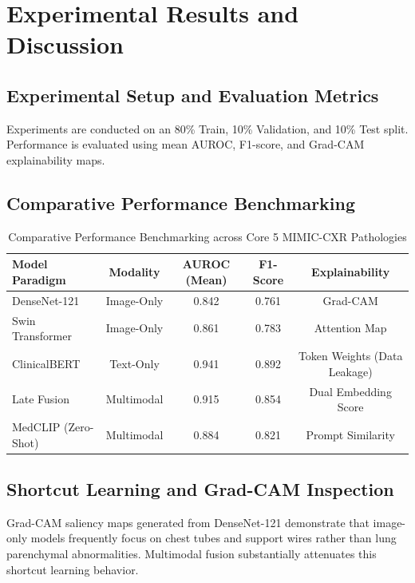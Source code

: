 \chapter{Experimental Results and Discussion}
\label{ch:experimental_results}

\section{Experimental Setup and Evaluation Metrics}
Experiments are conducted on an 80\% Train, 10\% Validation, and 10\% Test split. Performance is evaluated using mean AUROC, F1-score, and Grad-CAM explainability maps.

\section{Comparative Performance Benchmarking}

\begin{table}[H]
\centering
\caption{Comparative Performance Benchmarking across Core 5 MIMIC-CXR Pathologies}
\label{tab:results}
\begin{tabular}{lcccc}
\toprule
\textbf{Model Paradigm} & \textbf{Modality} & \textbf{AUROC (Mean)} & \textbf{F1-Score} & \textbf{Explainability} \\
\midrule
DenseNet-121 & Image-Only & 0.842 & 0.761 & Grad-CAM \\
Swin Transformer & Image-Only & 0.861 & 0.783 & Attention Map \\
ClinicalBERT & Text-Only & 0.941 & 0.892 & Token Weights (Data Leakage) \\
Late Fusion & Multimodal & 0.915 & 0.854 & Dual Embedding Score \\
MedCLIP (Zero-Shot) & Multimodal & 0.884 & 0.821 & Prompt Similarity \\
\bottomrule
\end{tabular}
\end{table}

\section{Shortcut Learning and Grad-CAM Inspection}
Grad-CAM saliency maps generated from DenseNet-121 demonstrate that image-only models frequently focus on chest tubes and support wires rather than lung parenchymal abnormalities. Multimodal fusion substantially attenuates this shortcut learning behavior.
